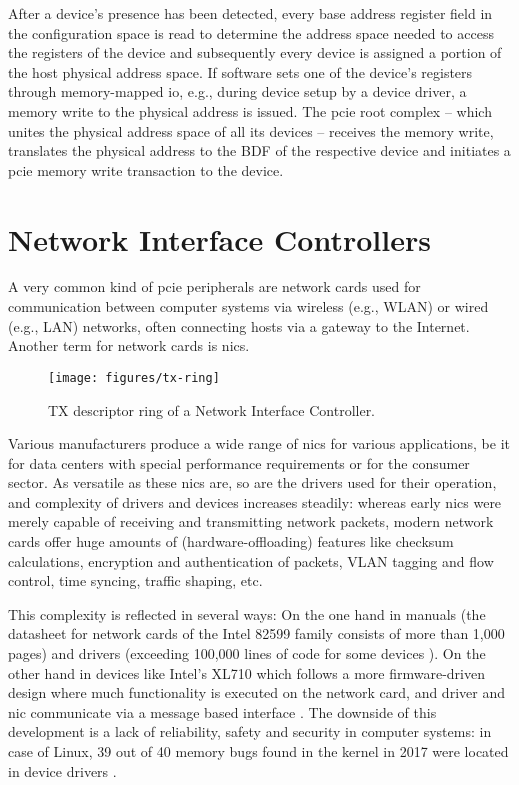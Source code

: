 After a device's presence has been detected, every base address register field
in the configuration space is read to determine the address space needed to
access the registers of the device and subsequently every device is assigned a
portion of the host physical address space. If software sets one of the device's
registers through memory-mapped \ac{io}, e.g., during device setup by a device
driver, a memory write to the physical address is issued. The \ac{pcie} root
complex -- which unites the physical address space of all its devices --
receives the memory write, translates the physical address to the BDF of the
respective device and initiates a \ac{pcie} memory write transaction to the
device.


\section{Network Interface Controllers}
\label{sec:nics}

A very common kind of \ac{pcie} peripherals are network cards used for
communication between computer systems via wireless (e.g., WLAN) or wired (e.g.,
LAN) networks, often connecting hosts via a gateway to the Internet. Another
term for network cards is \acfp{nic}.

\begin{figure}[!b]
    \centering
    \texttt{[image: figures/tx-ring]}
    \caption{TX descriptor ring of a Network Interface Controller.}
    \label{fig:tx-ring}
\end{figure}

Various manufacturers produce a wide range of \acp{nic} for various
applications, be it for data centers with special performance requirements or
for the consumer sector. As versatile as these \acp{nic} are, so are the drivers
used for their operation, and complexity of drivers and devices increases
steadily: whereas early \acp{nic} were merely capable of receiving and
transmitting network packets, modern network cards offer huge amounts of
(hardware-offloading) features like checksum calculations, encryption and
authentication of packets, VLAN tagging and flow control, time syncing, traffic
shaping, etc.

This complexity is reflected in several ways: On the one hand in manuals (the
datasheet for network cards of the Intel 82599 family \cite{intel2016datasheet}
consists of more than 1,000 pages) and drivers (exceeding 100,000 lines of code
for some devices \cite{emmerich2019case}). On the other hand in devices like
Intel's XL710 which follows a more firmware-driven design where much
functionality is executed on the network card, and driver and \ac{nic}
communicate via a message based interface \cite{emmerich2019user}. The downside
of this development is a lack of reliability, safety and security in computer
systems: in case of Linux, 39 out of 40 memory bugs found in the kernel in 2017
were located in device drivers \cite{emmerich2019case}.

